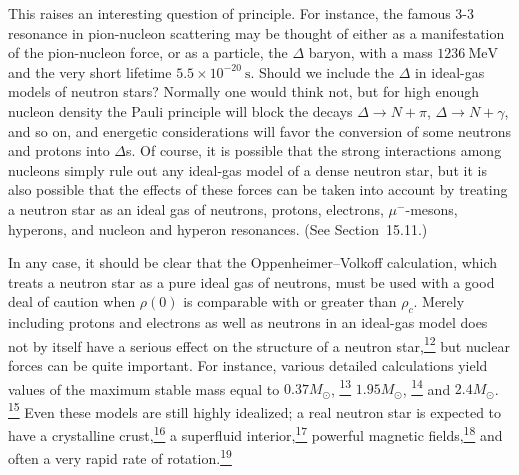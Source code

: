 This raises an interesting question of principle. For instance, the famous
\(3\)-\(3\) resonance in pion-nucleon scattering may be thought of either as
a manifestation of the pion-nucleon force, or as a particle, the
\(\Delta\) baryon, with a mass \(1236\ \mathrm{MeV}\) and the very short
lifetime \(5.5\times10^{-20}\ \mathrm{s}\). Should we include the \(\Delta\)
in ideal-gas models of neutron stars? Normally one would think not, but for
high enough nucleon density the Pauli principle will block the decays
\(\Delta\to N+\pi\), \(\Delta\to N+\gamma\), and so on, and energetic
considerations will favor the conversion of some neutrons and protons into
\(\Delta\)s. Of course, it is possible that the strong interactions among
nucleons simply rule out any ideal-gas model of a dense neutron star, but it
is also possible that the effects of these forces can be taken into account by
treating a neutron star as an ideal gas of neutrons, protons, electrons,
\(\mu^-\)-mesons, hyperons, and nucleon and hyperon resonances. (See
Section~15.11.)

In any case, it should be clear that the Oppenheimer--Volkoff calculation,
which treats a neutron star as a pure ideal gas of neutrons, must be used with
a good deal of caution when \(\rho(0)\) is comparable with or greater than
\(\rho_c\). Merely including protons and electrons as well as neutrons in an
ideal-gas model does not by itself have a serious effect on the structure of a
neutron star,\hyperref[ch11-ref-12]{\textsuperscript{12}} but nuclear forces
can be quite important. For instance, various detailed calculations yield
values of the maximum stable mass equal to \(0.37M_\odot\),
\hyperref[ch11-ref-13]{\textsuperscript{13}} \(1.95M_\odot\),
\hyperref[ch11-ref-14]{\textsuperscript{14}} and \(2.4M_\odot\).
\hyperref[ch11-ref-15]{\textsuperscript{15}} Even these models are still
highly idealized; a real neutron star is expected to have a crystalline
crust,\hyperref[ch11-ref-16]{\textsuperscript{16}} a superfluid
interior,\hyperref[ch11-ref-17]{\textsuperscript{17}} powerful magnetic
fields,\hyperref[ch11-ref-18]{\textsuperscript{18}} and often a very rapid
rate of rotation.\hyperref[ch11-ref-19]{\textsuperscript{19}}

